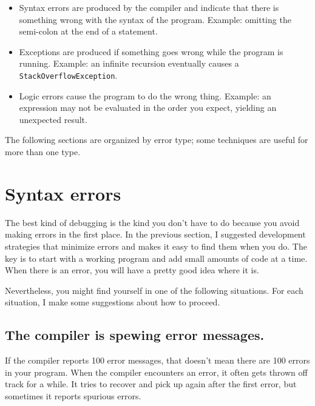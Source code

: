 \documentclass[12pt]{book}
\theoremstyle{exercise}
\begin{document}
\begin{itemize}

\item Syntax errors are produced by the compiler and indicate that
  there is something wrong with the syntax of the program.  Example:
  omitting the semi-colon at the end of a statement.

\item Exceptions are produced if something goes wrong while the
  program is running.  Example: an infinite recursion eventually
  causes a {\tt StackOverflowException}.

\item Logic errors cause the program to do the wrong thing.  Example:
  an expression may not be evaluated in the order you expect, yielding
  an unexpected result.

\end{itemize}


The following sections are organized by error type;
some techniques are useful for more than one type.


\section{Syntax errors}

The best kind of debugging is the kind you don't have to do
because you avoid making errors in the first place.  In the
previous section, I suggested development strategies that
minimize errors and makes it easy to find them when you do.
%
The key is to start with a working program and add small
amounts of code at a time.  When there is an error, you will
have a pretty good idea where it is.

Nevertheless, you might find yourself in one of the following
situations.  For each situation, I make some suggestions about
how to proceed.


\subsection*{The compiler is spewing error messages.}

If the compiler reports 100 error messages, that doesn't mean
there are 100 errors in your program.  When the compiler encounters
an error, it often gets thrown off track for a while.  It tries to
recover and pick up again after the first error, but sometimes
it reports spurious errors.
\end{document}

